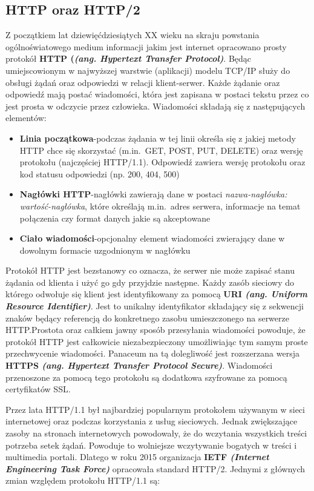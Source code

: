 \subsection{HTTP oraz HTTP/2}
Z początkiem lat dziewięćdziesiątych XX wieku na skraju powstania ogólnoświatowego medium informacji jakim jest internet opracowano prosty protokół \textbf{HTTP (\textit{(ang. Hypertext Transfer Protocol)}}. Będąc umiejscowionym w najwyższej warstwie (aplikacji) modelu TCP/IP służy do obsługi żądań oraz odpowiedzi w relacji klient-serwer\cite{gourley2002http}. Każde żądanie oraz odpowiedź mają postać wiadomości, która jest zapisana w postaci tekstu przez co jest prosta w odczycie przez człowieka. Wiadomości składają się z następujących elementów:
\begin{itemize}
    \item  \textbf{Linia początkowa}-podczas żądania w tej linii określa się z jakiej metody HTTP chce się skorzystać (m.in.\ GET, POST, PUT, DELETE) oraz wersję protokołu (najczęściej HTTP/1.1). Odpowiedź zawiera wersję protokołu oraz kod statusu odpowiedzi (np. 200, 404, 500)
    \item  \textbf{Nagłówki HTTP}-nagłówki zawierają dane w postaci \textit{nazwa-nagłówka: wartość-nagłówka}, które określają m.in.\ adres serwera, informacje na temat połączenia czy format danych jakie są akceptowane\cite{gourley2002httphead}
    \item \textbf{Ciało wiadomości}-opcjonalny element wiadomości zwierający dane w dowolnym formacie uzgodnionym w nagłówku 
\end{itemize}
Protokół HTTP jest bezstanowy co oznacza, że serwer nie może zapisać stanu żądania od klienta i użyć go gdy przyjdzie następne. Każdy zasób sieciowy do którego odwołuje się klient jest identyfikowany za pomocą \textbf{URI \textit{(ang. Uniform Resource Identifier)}}\cite{berners2014rfc}. Jest to unikalny identyfikator składający się z sekwencji znaków będący referencją do konkretnego zasobu umieszczonego na serwerze HTTP.\@ Prostota oraz całkiem jawny sposób przesyłania wiadomości powoduje, że protokół HTTP jest całkowicie niezabezpieczony umożliwiając tym samym proste przechwycenie wiadomości. Panaceum na tą dolegliwość jest rozszerzana wersja \textbf{HTTPS \textit{(ang. Hypertext Transfer Protocol Secure)}}. Wiadomości przenoszone za pomocą tego protokołu są dodatkowa szyfrowane za pomocą certyfikatów SSL.\@
\par Przez lata HTTP/1.1 był najbardziej popularnym protokołem używanym w sieci internetowej oraz podczas korzystania z usług sieciowych. Jednak zwiększające zasoby na stronach internetowych powodowały, że do wczytania wszystkich treści potrzeba setek żądań. Powoduje to wolniejsze wczytywanie bogatych w treści i multimedia portali. Dlatego w roku 2015 organizacja \textbf{IETF \textit{(Internet Engineering Task Force)}} opracowała standard HTTP/2\cite{belshe2015hypertext}. Jednymi z głównych zmian względem protokołu HTTP/1.1 są:
